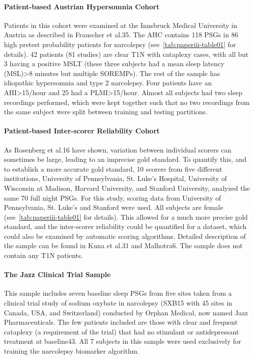 \paragraph{Patient-based Austrian Hypersomnia Cohort}
Patients in this cohort were examined at the Innsbruck Medical University in Austria as described in Frauscher et al.35.
The AHC contains 118 PSGs in 86 high pretest probability patients for narcolepsy (see~\cref{tab:paperiii-table01} for details).
42 patients (81 studies) are clear T1N with cataplexy cases, with all but 3 having a positive MSLT (these three subjects had a mean sleep latency (MSL)>8 minutes but multiple SOREMPs).
The rest of the sample has idiopathic hypersomnia and type 2 narcolepsy.
Four patients have an AHI>15/hour and 25 had a PLMI>15/hour.
Almost all subjects had two sleep recordings performed, which were kept together such that no two recordings from the same subject were split between training and testing partitions.

\paragraph{Patient-based Inter-scorer Reliability Cohort}
As Rosenberg et al.16 have shown, variation between individual scorers can sometimes be large, leading to an imprecise gold standard.
To quantify this, and to establish a more accurate gold standard, 10 scorers from five different institutions, University of Pennsylvania, St. Luke’s Hospital, University of Wisconsin at Madison, Harvard University, and Stanford University, analyzed the same 70 full night PSGs.
For this study, scoring data from University of Pennsylvania, St. Luke’s and Stanford were used.
All subjects are female (see~\cref{tab:paperiii-table01} for details).
This allowed for a much more precise gold standard, and the inter-scorer reliability could be quantified for a dataset, which could also be examined by automatic scoring algorithms.
Detailed description of the sample can be found in Kuna et al.31 and Malhotra6.
The sample does not contain any T1N patients.

\paragraph{The Jazz Clinical Trial Sample}
This sample includes seven baseline sleep PSGs from five sites taken from a clinical trial study of sodium oxybate in narcolepsy (SXB15 with 45 sites in Canada, USA, and Switzerland) conducted by Orphan Medical, now named Jazz Pharmaceuticals.
The few patients included are those with clear and frequent cataplexy (a requirement of the trial) that had no stimulant or antidepressant treatment at baseline43.
All 7 subjects in this sample were used exclusively for training the narcolepsy biomarker algorithm.

